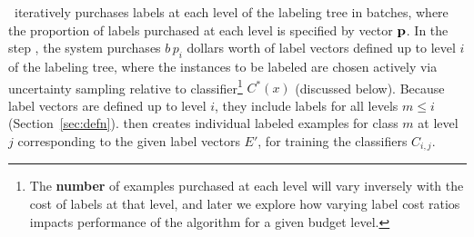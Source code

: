 \documentclass[10pt, conference, compsocconf]{IEEEtran}
\newcommand{\sys}{\Call{Hal}{}} %
\begin{document}
\sys\ iteratively purchases labels at each level of the labeling tree in batches,
where the proportion of labels purchased at each level is specified by
vector ${\bf p}$.  
In the step ,
the system purchases $b \, p_i$ dollars worth of label vectors
defined up to level $i$ of the labeling tree, where the instances to be labeled are
chosen actively via uncertainty sampling relative to classifier\footnote{The {
\bf number} of examples purchased at each level will vary inversely with the cost of labels
at that level, and later we explore how varying label cost ratios impacts performance of the algorithm
for a given budget level.
} $C^*(x)$ (discussed below).
Because label vectors are defined up to level $i$, they include
labels for all levels $m \le i$ (Section~\ref{sec:defn}).
 then creates individual labeled examples for
class $m$ at level $j$
corresponding to the given label vectors $E'$, for training the classifiers $C_{i, j}$.




\end{document}
